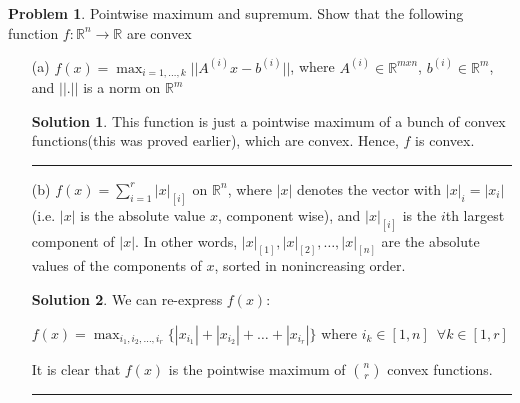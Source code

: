 \documentclass{article}
\theoremstyle{definition}
\newtheorem{problem}{Problem}
\def\fline{\rule{0.75\linewidth}{0.5pt}}
\newcommand{\finishline}{\begin{center}\fline\end{center}}
\newtheorem*{solution*}{Solution}
\newenvironment{solution}{\begin{solution*}}{{\finishline} \end{solution*}}
\begin{document}
\begin{problem}
    {Pointwise maximum and supremum.} Show that the following function $f: \mathbb{R}^n \rightarrow \mathbb{R}$ are convex

    \begin{itemize}
        \item[(a)] $f(x) = \max_{i = 1, \dots, k} || A^{(i)}x - b^{(i)}||$, where $A^{(i)} \in \mathbb{R}^{m x n}$, $b^{(i)} \in \mathbb{R}^m$, and $||.||$ is a norm on $\mathbb{R}^m$

        \begin{solution}
            This function is just a pointwise maximum of a bunch of convex functions(this was proved earlier), which are convex. Hence, $f$ is convex. 
        \end{solution}

        \item[(b)] $f(x) = \sum_{i=1}^{r} |x|_{[i]}$ on $\mathbb{R}^n$, where $|x|$ denotes the vector with $|x|_i = |x_i|$ (i.e. $|x|$ is the absolute value $x$, component wise), and $|x|_{[i]}$ is the $i$th largest component of $|x|$.  In other words,  $|x|_{[1]}, |x|_{[2]}, \dots , |x|_{[n]}$ are the absolute values of the components of $x$, sorted in nonincreasing order.

        \begin{solution}
            We can re-express $f(x)$: \newline 

            $f(x) = \max_{i_1, i_2, \dots, i_r} \{|x_{i_1}| + |x_{i_2}| + \dots + |x_{i_r}|\}$ where $i_k \in [1, n] \enspace \forall k \in [1, r]$ \newline 

            It is clear that $f(x)$ is the pointwise maximum of $\binom{n}{r}$ convex functions. 

            
        \end{solution}
    \end{itemize}
\end{problem}
\end{document}
